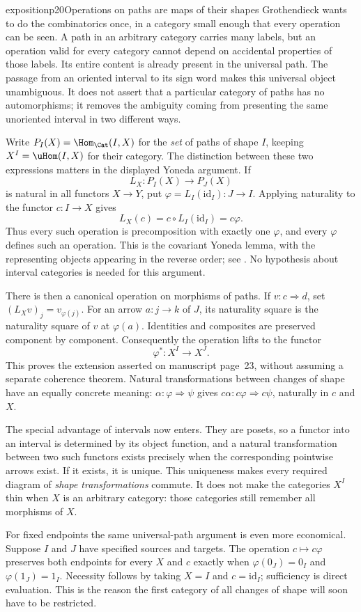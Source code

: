 \begin{dcomment}{exposition}{p20}{Operations on paths are maps of their shapes}
Grothendieck wants to do the combinatorics once, in a category small enough that every operation can be seen. A path in an arbitrary category carries many labels, but an operation valid for every category cannot depend on accidental properties of those labels. Its entire content is already present in the universal path. The passage from an oriented interval to its sign word makes this universal object unambiguous. It does not assert that a particular category of paths has no automorphisms; it removes the ambiguity coming from presenting the same unoriented interval in two different ways.

Write $P_I(X)=\Hom_{\Cat}(I,X)$ for the \emph{set} of paths of shape $I$, keeping $X^I=\uHom(I,X)$ for their category. The distinction between these two expressions matters in the displayed Yoneda argument. If
\[
 L_X:P_I(X)\longrightarrow P_J(X)
\]
is natural in all functors $X\to Y$, put $\varphi=L_I(\mathrm{id}_I):J\to I$. Applying naturality to the functor $c:I\to X$ gives
\[
 L_X(c)=c\circ L_I(\mathrm{id}_I)=c\varphi.
\]
Thus every such operation is precomposition with exactly one $\varphi$, and every $\varphi$ defines such an operation. This is the covariant Yoneda lemma, with the representing objects appearing in the reverse order; see \citet[Theorem~2.2.4 and Corollary~2.2.8]{Riehl2016}. No hypothesis about interval categories is needed for this argument.

There is then a canonical operation on morphisms of paths. If $v:c\Rightarrow d$, set $(L_Xv)_j=v_{\varphi(j)}$. For an arrow $a:j\to k$ of $J$, its naturality square is the naturality square of $v$ at $\varphi(a)$. Identities and composites are preserved component by component. Consequently the operation lifts to the functor
\[
 \varphi^*:X^I\longrightarrow X^J.
\]
This proves the extension asserted on manuscript page~23, without assuming a separate coherence theorem. Natural transformations between changes of shape have an equally concrete meaning: $\alpha:\varphi\Rightarrow\psi$ gives $c\alpha:c\varphi\Rightarrow c\psi$, naturally in $c$ and $X$.

The special advantage of intervals now enters. They are posets, so a functor into an interval is determined by its object function, and a natural transformation between two such functors exists precisely when the corresponding pointwise arrows exist. If it exists, it is unique. This uniqueness makes every required diagram of \emph{shape transformations} commute. It does not make the categories $X^I$ thin when $X$ is an arbitrary category: those categories still remember all morphisms of $X$.

For fixed endpoints the same universal-path argument is even more economical. Suppose $I$ and $J$ have specified sources and targets. The operation $c\mapsto c\varphi$ preserves both endpoints for every $X$ and $c$ exactly when $\varphi(0_J)=0_I$ and $\varphi(1_J)=1_I$. Necessity follows by taking $X=I$ and $c=\mathrm{id}_I$; sufficiency is direct evaluation. This is the reason the first category of all changes of shape will soon have to be restricted.
\end{dcomment}

